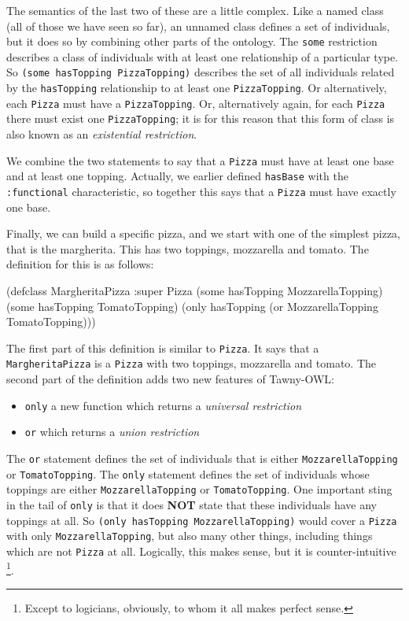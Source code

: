 The semantics of the last two of these are a little complex. Like a named
class (all of those we have seen so far), an unnamed class defines a set of
individuals, but it does so by combining other parts of the ontology. The
\verb~some~ restriction describes a class of individuals with at least one
relationship of a particular type. So \verb~(some hasTopping PizzaTopping)~
describes the set of all individuals related by the \verb~hasTopping~ relationship
to at least one \verb~PizzaTopping~. Or alternatively, each \verb~Pizza~ must have a
\verb~PizzaTopping~. Or, alternatively again, for each \verb~Pizza~ there must exist one
\verb~PizzaTopping~; it is for this reason that this form of class is also known as
an \emph{existential restriction}.

We combine the two statements to say that a \verb~Pizza~ must have at least one
base and at least one topping. Actually, we earlier defined \verb~hasBase~ with the
\verb~:functional~ characteristic, so together this says that a \verb~Pizza~ must have
exactly one base.

Finally, we can build a specific pizza, and we start with one of the simplest
pizza, that is the margherita. This has two toppings, mozzarella and tomato.
The definition for this is as follows:

\begin{tawny}
(defclass MargheritaPizza
  :super
  Pizza
  (some hasTopping MozzarellaTopping)
  (some hasTopping TomatoTopping)
  (only hasTopping (or MozzarellaTopping TomatoTopping)))
\end{tawny}

The first part of this definition is similar to \verb~Pizza~. It says that a
\verb~MargheritaPizza~ is a \verb~Pizza~ with two toppings, mozzarella and tomato. The
second part of the definition adds two new features of Tawny-OWL:

\begin{itemize}
\item \verb~only~ a new function which returns a \emph{universal restriction}
\item \verb~or~ which returns a \emph{union restriction}
\end{itemize}

The \verb~or~ statement defines the set of individuals that is either
\verb~MozzarellaTopping~ or \verb~TomatoTopping~. The \verb~only~ statement defines the set
of individuals whose toppings are either \verb~MozzarellaTopping~ or
\verb~TomatoTopping~. One important sting in the tail of \verb~only~ is that it does
\textbf{NOT} state that these individuals have any toppings at all. So \verb~(only hasTopping MozzarellaTopping)~ would cover a \verb~Pizza~ with only
\verb~MozzarellaTopping~, but also many other things, including things which are
not \verb~Pizza~ at all. Logically, this makes sense, but it is counter-intuitive
\footnote{Except to logicians, obviously, to whom it all makes perfect sense.}.

